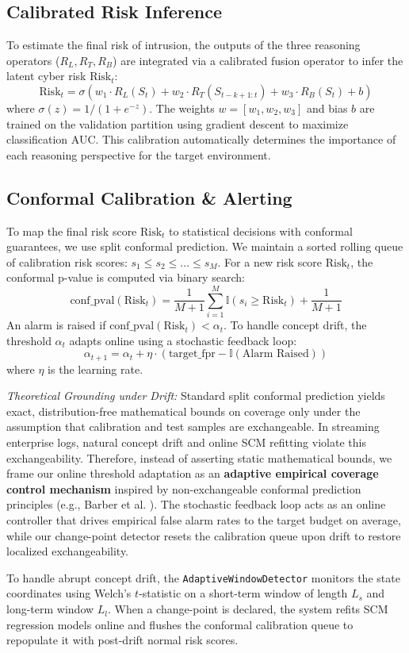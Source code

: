 \subsection{Calibrated Risk Inference}
To estimate the final risk of intrusion, the outputs of the three reasoning operators ($R_L, R_T, R_B$) are integrated via a calibrated fusion operator to infer the latent cyber risk $\text{Risk}_t$:
\begin{equation}
\text{Risk}_t = \sigma(w_1 \cdot R_L(S_t) + w_2 \cdot R_T(S_{t-k+1:t}) + w_3 \cdot R_B(S_t) + b)
\end{equation}
where $\sigma(z) = 1/(1+e^{-z})$. The weights $w = [w_1, w_2, w_3]$ and bias $b$ are trained on the validation partition using gradient descent to maximize classification AUC. This calibration automatically determines the importance of each reasoning perspective for the target environment.

\subsection{Conformal Calibration \& Alerting}
To map the final risk score $\text{Risk}_t$ to statistical decisions with conformal guarantees, we use split conformal prediction. We maintain a sorted rolling queue of calibration risk scores: $s_1 \leq s_2 \leq \dots \leq s_M$. For a new risk score $\text{Risk}_t$, the conformal p-value is computed via binary search:
\begin{equation}
\text{conf\_pval}(\text{Risk}_t) = \frac{1}{M+1} \sum_{i=1}^M \mathbb{I}(s_i \geq \text{Risk}_t) + \frac{1}{M+1}
\end{equation}
An alarm is raised if $\text{conf\_pval}(\text{Risk}_t) < \alpha_t$. To handle concept drift, the threshold $\alpha_t$ adapts online using a stochastic feedback loop:
\begin{equation}
\alpha_{t+1} = \alpha_t + \eta \cdot (\text{target\_fpr} - \mathbb{I}(\text{Alarm Raised}))
\end{equation}
where $\eta$ is the learning rate.

\textit{Theoretical Grounding under Drift:} Standard split conformal prediction yields exact, distribution-free mathematical bounds on coverage only under the assumption that calibration and test samples are exchangeable. In streaming enterprise logs, natural concept drift and online SCM refitting violate this exchangeability. Therefore, instead of asserting static mathematical bounds, we frame our online threshold adaptation as an \textbf{adaptive empirical coverage control mechanism} inspired by non-exchangeable conformal prediction principles (e.g., Barber et al. \cite{barber2023conformal}). The stochastic feedback loop acts as an online controller that drives empirical false alarm rates to the target budget on average, while our change-point detector resets the calibration queue upon drift to restore localized exchangeability.

To handle abrupt concept drift, the \texttt{AdaptiveWindowDetector} monitors the state coordinates using Welch's $t$-statistic on a short-term window of length $L_s$ and long-term window $L_l$. When a change-point is declared, the system refits SCM regression models online and flushes the conformal calibration queue to repopulate it with post-drift normal risk scores.
